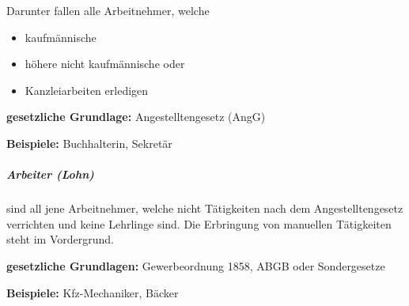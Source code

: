 \documentclass{htblagkr}
\begin{document}
    Darunter fallen alle Arbeitnehmer, welche

    \begin{itemize}
        \item{kaufmännische}
        \item{höhere nicht kaufmännische oder}
        \item{Kanzleiarbeiten erledigen}
    \end{itemize}

    \textbf{gesetzliche Grundlage:} Angestelltengesetz (AngG)

    \textbf{Beispiele:} Buchhalterin, Sekretär

    \subparagraph{Arbeiter (Lohn)}

    sind all jene Arbeitnehmer, welche nicht Tätigkeiten nach dem Angestelltengesetz verrichten und keine Lehrlinge sind.
    Die Erbringung von manuellen Tätigkeiten steht im Vordergrund.

    \textbf{gesetzliche Grundlagen:} Gewerbeordnung 1858, ABGB oder Sondergesetze

    \textbf{Beispiele:} Kfz-Mechaniker, Bäcker
\end{document}
